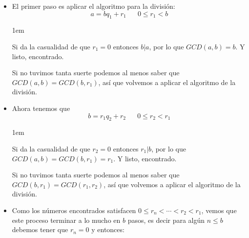 \documentclass[12pt, fleqn]{report}                             %
\newenvironment{SmallIndentation}[1][0.75em]                    %
    {\begin{adjustwidth}{#1}{}\begin{footnotesize}}                 %
    {\end{footnotesize}\end{adjustwidth}}                           %
\DeclareMathOperator \Space {\quad}                             %
\begin{document}
            \begin{itemize}
                \item
                    El primer paso es aplicar el algoritmo para la división:
                    \begin{equation*}
                        a = bq_1 +r_1 \Space 0 \leq r_1 < b
                    \end{equation*}

                    \begin{SmallIndentation}[1em]
                        Si da la casualidad de que $r_1 = 0$ entonces $b|a$, por lo
                        que $GCD(a,b) = b$. Y listo, encontrado.

                        Si no tuvimos tanta suerte podemos al menos saber que
                        $GCD(a,b) = GCD(b,r_1)$, así que volvemos a aplicar el
                        algoritmo de la división.

                    \end{SmallIndentation}

                    
                \item
                    Ahora tenemos que 
                    \begin{equation*}
                        b = r_1q_2 +r_2 \Space 0 \leq r_2 < r_1
                    \end{equation*}

                    \begin{SmallIndentation}[1em]
                        Si da la casualidad de que $r_2 = 0$ entonces $r_1|b$, por lo
                        que $GCD(a,b) = GCD(b,r_1)=r_1$. Y listo, encontrado.

                        Si no tuvimos tanta suerte podemos al menos saber que
                        $GCD(b,r_1) = GCD(r_1,r_2)$, así que volvemos a aplicar el
                        algoritmo de la división.

                    \end{SmallIndentation}

                    


                \item
                    Como los números encontrados satisfacen $0 \leq r_n < \cdots < r_2 < r_1$,
                    vemos que este proceso terminar a lo mucho en $b$ pasos, es decir para algún
                    $n \leq b$ debemos tener que $r_n=0$ y entonces:


\end{itemize}
\end{document}
